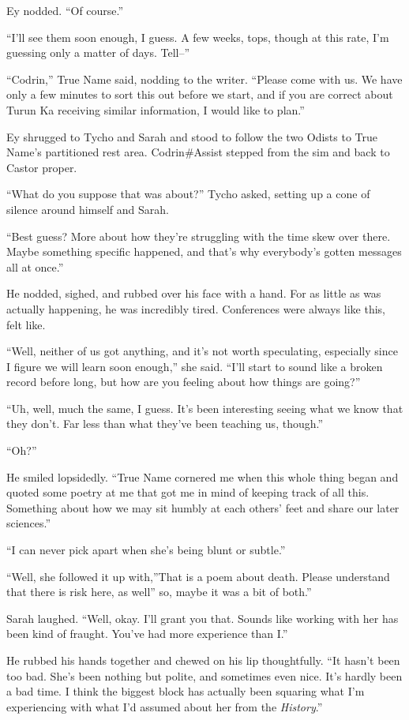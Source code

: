 Ey nodded. ``Of course.''

``I'll see them soon enough, I guess. A few weeks, tops, though at this rate, I'm guessing only a matter of days. Tell--''

``Codrin,'' True Name said, nodding to the writer. ``Please come with us. We have only a few minutes to sort this out before we start, and if you are correct about Turun Ka receiving similar information, I would like to plan.''

Ey shrugged to Tycho and Sarah and stood to follow the two Odists to True Name's partitioned rest area. Codrin\#Assist stepped from the sim and back to Castor proper.

``What do you suppose that was about?'' Tycho asked, setting up a cone of silence around himself and Sarah.

``Best guess? More about how they're struggling with the time skew over there. Maybe something specific happened, and that's why everybody's gotten messages all at once.''

He nodded, sighed, and rubbed over his face with a hand. For as little as was actually happening, he was incredibly tired. Conferences were always like this, felt like.

``Well, neither of us got anything, and it's not worth speculating, especially since I figure we will learn soon enough,'' she said. ``I'll start to sound like a broken record before long, but how are you feeling about how things are going?''

``Uh, well, much the same, I guess. It's been interesting seeing what we know that they don't. Far less than what they've been teaching us, though.''

``Oh?''

He smiled lopsidedly. ``True Name cornered me when this whole thing began and quoted some poetry at me that got me in mind of keeping track of all this. Something about how we may sit humbly at each others' feet and share our later sciences.''

``I can never pick apart when she's being blunt or subtle.''

``Well, she followed it up with,''That is a poem about death. Please understand that there is risk here, as well'' so, maybe it was a bit of both.''

Sarah laughed. ``Well, okay. I'll grant you that. Sounds like working with her has been kind of fraught. You've had more experience than I.''

He rubbed his hands together and chewed on his lip thoughtfully. ``It hasn't been too bad. She's been nothing but polite, and sometimes even nice. It's hardly been a bad time. I think the biggest block has actually been squaring what I'm experiencing with what I'd assumed about her from the \emph{History}.''

